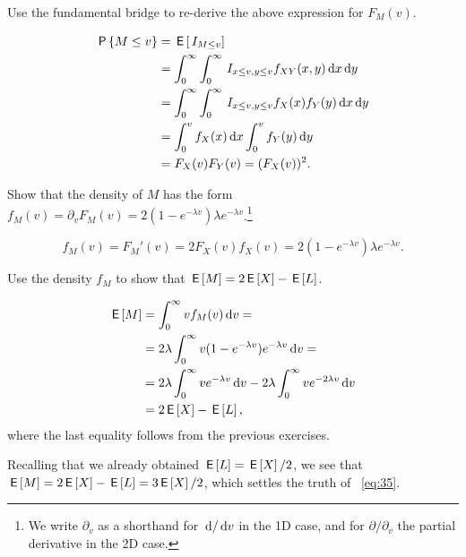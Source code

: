 \begin{exercise}
Use the fundamental bridge to re-derive the above expression for $F_M(v)$.
\begin{solution}
\begin{align*}
\,\mathsf{P}\left\{M\leq v\right\}
&= \,\mathsf{E}\left[\,I_{M\leq v}\right] \\
&=\int_0^{\infty} \int_0^{\infty} \,I_{x\leq v, y\leq v} f_{XY}(x,y) \,\textrm{d}x \,\textrm{d}y \\
&= \int_0^{\infty} \int_0^{\infty} \,I_{x\leq v, y\leq v} f_{X}(x) f_{Y}(y) \,\textrm{d}x \,\textrm{d}y \\
&= \int_0^{v} f_{X}(x) \,\textrm{d}x \int_0^{v}  f_{Y}(y)  \,\textrm{d}y \\
&= F_{X}(v) F_Y(v) = (F_X(v))^2.
\end{align*}
\end{solution}
\end{exercise}


\begin{exercise}\label{ex:6}
Show that the density of $M$ has the form $f_{M}(v)=\partial_{v} F_M(v) = 2(1-e^{-\lambda v}) \lambda e^{-\lambda v}$.\footnote{We write $\partial_{v}$ as a shorthand for $\,\textrm{d}/\,\textrm{d}v$ in the 1D case, and for $\partial/\partial_{v}$ the partial derivative in the 2D case.}
\begin{solution}
\begin{equation*}
  f_M(v) = F_M'(v) = 2 F_X(v) f_X(v) = 2(1-e^{-\lambda v}) \lambda e^{- \lambda v}.
\end{equation*}
\end{solution}
\end{exercise}

\begin{exercise}
Use  the density $f_{M}$ to show  that $\,\mathsf{E}\left[M\right] = 2\,\mathsf{E}\left[X\right] - \,\mathsf{E}\left[L\right]$.
\begin{solution}
\begin{align*}
\,\mathsf{E}\left[M\right]
&= \int_{0}^{\infty} v f_M(v) \,\textrm{d}v = \\
&= 2 \lambda \int_{0}^{\infty} v (1-e^{-\lambda v}) e^{-\lambda v} \,\textrm{d}v = \\
&= 2 \lambda \int_{0}^{\infty} v e^{-\lambda v} \,\textrm{d}v -  2 \lambda \int_{0}^{\infty} v e^{-2 \lambda v} \,\textrm{d}v \\
&= 2 \,\mathsf{E}\left[X\right] - \,\mathsf{E}\left[L\right],
\end{align*}
where the last equality follows from the previous exercises.
\end{solution}
\end{exercise}

Recalling that we already obtained  $\,\mathsf{E}\left[L\right] = \,\mathsf{E}\left[X\right]/ 2$,  we see that $\,\mathsf{E}\left[M\right] = 2 \,\mathsf{E}\left[X\right] - \,\mathsf{E}\left[L\right] = 3\,\mathsf{E}\left[X\right]/2$, which settles the truth of ~\cref{eq:35}.



